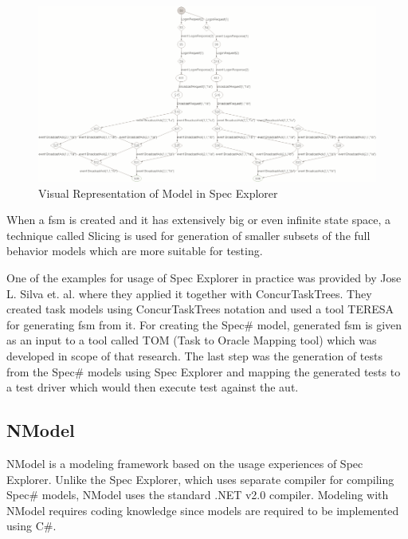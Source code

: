 \begin{figure} [htbp!]
	\centering
					\includegraphics[width=1\textwidth]{figures/Model_View_In_SpecExplorer.png}
					\caption{\label{Fig:Model_View_In_SpecExplorer} Visual Representation of Model in Spec Explorer \cite{SpecExplorer_ModelView}}
\end{figure}

\par
When a \acrshort{fsm} is created and it has extensively big or even infinite state space, a technique called Slicing is used for generation of smaller subsets of the full behavior models which are more suitable for testing.

\par
One of the examples for usage of Spec Explorer in practice was provided by Jose L. Silva et. al. \cite{Silva_SpecExplorer} where they applied it together with ConcurTaskTrees. They created task models using ConcurTaskTrees notation
and used a tool TERESA for generating \acrshort{fsm} from it. For creating the Spec\# model, generated \acrshort{fsm} is given as an input to a tool called TOM (Task to Oracle Mapping tool) which was developed in scope of that research. The last step was the generation of tests from the Spec\# models using Spec Explorer and mapping the generated tests to a test driver which would then execute test against the \acrshort{aut}.

\subsection{NModel}
\par
NModel \cite{NModel_Description} \cite{NModel_Description2} is a modeling framework based on the usage experiences of Spec Explorer. Unlike the Spec Explorer, which uses separate compiler for compiling Spec\# models, NModel uses the standard .NET v2.0 compiler. Modeling with NModel requires coding knowledge since models are required to be implemented using C\#.

